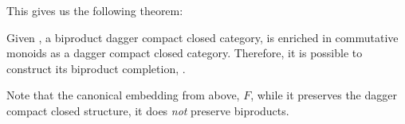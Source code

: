 This gives us the following theorem:

\begin{theorem}\label{theorem:biproductcompletion}
Given \cD, a biproduct dagger compact closed category,  is enriched in commutative monoids
as a dagger compact closed category. Therefore, it is possible to construct its biproduct
completion, .
\end{theorem}

Note that the canonical embedding from above, $F$, while it preserves the dagger compact closed
structure, it does \emph{not} preserve biproducts.

